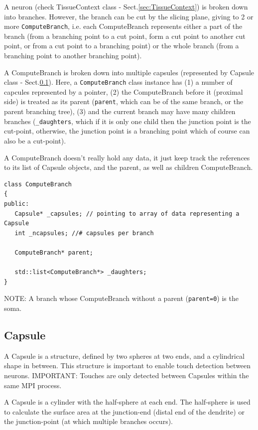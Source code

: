 A neuron (check TissueContext class - Sect.\ref{sec:TissueContext}) is broken
down into branches. However, the branch can be cut by the slicing plane, giving
to 2 or more \verb!ComputeBranch!, i.e. each ComputeBranch represents either a
part of the branch (from a branching point to a cut point, form a cut point to
another cut point, or from a cut point to a branching point) or the whole
branch (from a branching point to another branching point).



A ComputeBranch is broken down into multiple capsules (represented by Capsule
class - Sect.\ref{sec:Capsule}). Here, a \verb!ComputeBranch! class instance has
(1) a number of capcules represented by a pointer, (2) the ComputeBranch before
it (proximal side) is treated as its parent (\verb!parent!, which can be of
the same branch, or the parent branching tree), (3) and the current branch may
have many children branches (\verb!_daughters!, which if it is only one child
then the junction point is the cut-point, otherwise, the junction point is a
branching point which of course can also be a cut-point).

A ComputeBranch doesn't really hold any data, it just keep track the references
to its list of Capsule objects, and the parent, as well as children
ComputeBranch.

\begin{lstlisting}
class ComputeBranch
{
public:
   Capsule* _capsules; // pointing to array of data representing a Capsule
   int _ncapsules; //# capsules per branch
   
   ComputeBranch* parent;
   
   std::list<ComputeBranch*> _daughters;
}
\end{lstlisting}

NOTE: A branch whose ComputeBranch without a parent (\verb!parent=0!) is the
soma.

\subsection{Capsule}
\label{sec:Capsule}
\label{sec:Sphere}


A Capsule is a structure, defined by two spheres at two ends, and a cylindrical
shape in between. This structure is important to enable touch detection between
neurons. IMPORTANT: Touches are only detected between Capsules within the same
MPI process.

A Capsule is a cylinder with the half-sphere at each end. The half-sphere is used
to calculate the surface area at the junction-end (distal end of the dendrite)
or the junction-point (at which multiple branches occurs).

